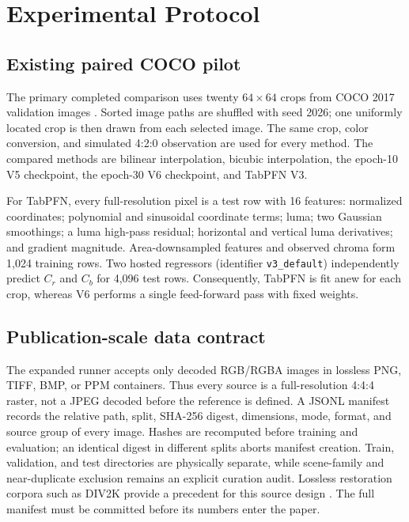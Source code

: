 \documentclass[10pt,twocolumn]{article}
\newcommand{\model}{V6}
\newcommand{\code}[1]{\texttt{#1}}
\begin{document}
\section{Experimental Protocol}

\subsection{Existing paired COCO pilot}

The primary completed comparison uses twenty $64\!\times\!64$ crops from COCO 2017
validation images \cite{lin2014coco}.  Sorted image paths are shuffled with seed
2026; one uniformly located crop is then drawn from each selected image.  The
same crop, color conversion, and simulated 4:2:0 observation are used for every
method.  The compared methods are bilinear interpolation, bicubic interpolation,
the epoch-10 V5 checkpoint, the epoch-30 \model{} checkpoint, and TabPFN V3.

For TabPFN, every full-resolution pixel is a test row with 16 features: normalized
coordinates; polynomial and sinusoidal coordinate terms; luma; two Gaussian
smoothings; a luma high-pass residual; horizontal and vertical luma derivatives;
and gradient magnitude.  Area-downsampled features and observed chroma form
1,024 training rows.  Two hosted regressors (identifier
\code{v3\_default}) independently predict $C_r$ and $C_b$ for 4,096 test rows.
Consequently, TabPFN is fit anew for each crop, whereas \model{} performs a
single feed-forward pass with fixed weights.

\subsection{Publication-scale data contract}

The expanded runner accepts only decoded RGB/RGBA images in lossless PNG, TIFF,
BMP, or PPM containers.  Thus every source is a full-resolution 4:4:4 raster,
not a JPEG decoded before the reference is defined.  A JSONL manifest records
the relative path, split, SHA-256 digest, dimensions, mode, format, and source
group of every image.  Hashes are recomputed before training and evaluation; an
identical digest in different splits aborts manifest creation.  Train,
validation, and test directories are physically separate, while scene-family
and near-duplicate exclusion remains an explicit curation audit.  Lossless
restoration corpora such as DIV2K provide a precedent for this source design
\cite{agustsson2017div2k}.  The full manifest must be committed before its
numbers enter the paper.
\end{document}
